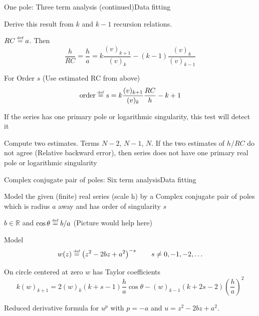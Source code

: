 \documentclass[11pt,svgnames,fleqn]{beamer}
\newcommand{\defeq}{\stackrel{\textup{\tiny def}}{=}}
\newcommand{\parbg}[1]{\left(  {#1} \right)}
\def\Rz{\mathbb{R}}
\newcommand{\NC}[1]{{\color{red}#1}}
\newcommand{\DM}[1]{\begin{displaymath} {#1} \end{displaymath}}
\newcommand{\tc}[2]{(#1)_{#2}}
\begin{document}
\begin{frame}{One pole: Three term analysis (continued)}{Data fitting}

  Derive this result from $k$ and $k-1$ recursion relations.

\vspace{2mm}

$RC \defeq a$. Then
\DM
{
  \frac{h}{RC} = \frac{h}{a} = k \frac{\tc{v}{k+1}}{\tc{v}{k}} - \parbg{k-1} \frac{\tc{v}{k}}{\tc{v}{k-1}}
}
  
  For Order $s$ (Use estimated RC from above)
\DM
{
  \text{order} \defeq s = k \frac{\tc{v}{k+1}}{\tc{v}{k}}\frac{RC}{h} - k + 1
}

  \NC{If the series has one primary pole or logarithmic singularity, this test will detect it}

  \vspace{2mm}

  Compute two estimates. Terms $N-2$, $N-1$, $N$.
  If the two estimates of $h/RC$ do not agree (Relative backward error), then series does not have
  one primary real pole or logarithmic singularity
\end{frame}

\begin{frame}{Complex conjugate pair of poles: Six term analysis}{Data fitting}

  Model the given (finite) real series (scale h) by a Complex conjugate pair of poles
  which is radius $a$ away and has order of singularity $s$

  \vspace{2mm}

  $b \in \Rz$ and $\cos \theta \defeq b/a$ (Picture would help here)

  \vspace{2mm}

  Model
  \DM
  {
    w(z) \defeq \parbg{z^2 - 2 b z + a^2}^{-s} \qquad s \neq 0, -1, -2, \ldots
  }

  \vspace{2mm}

  On circle centered at zero $w$ has Taylor coefficients 
  \DM
  {
    k \tc{w}{k+1} = 2 \tc{w}{k}\parbg{k+s-1}\frac{h}{a} \cos \theta 
    - \tc{w}{k-1}\parbg{k+2s-2}\parbg{\frac{h}{a}}^2
  }
 
  Reduced derivative formula for $u^p$ with $p=-a$ and $u=z^2 - 2 b z + a^2$.
\end{frame}
\end{document}
